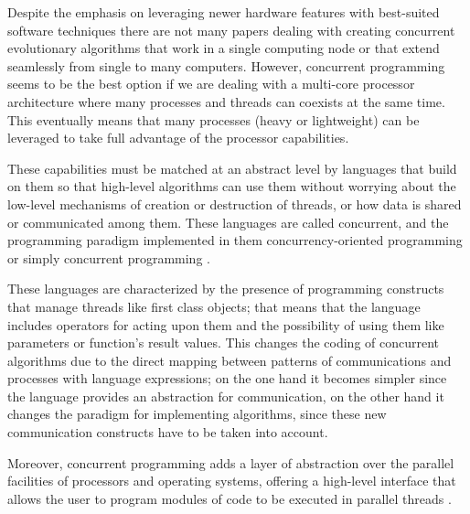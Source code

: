 \documentclass[runningheads]{llncs}\usepackage[]{graphicx}\usepackage[]{color}
\begin{document}
Despite the emphasis on leveraging newer hardware features
with best-suited software techniques
 there are not many papers \cite{Xia2010} dealing with 
creating concurrent evolutionary algorithms that work in a single
computing node or that extend seamlessly from single to many
computers. However, concurrent programming seems to be the best 
option if we are dealing with a multi-core processor architecture 
where many processes and threads can coexists at the same time. 
 This eventually means that many
processes (heavy or lightweight) can be leveraged to take full
advantage of the processor capabilities.

These capabilities must be matched at an abstract level by languages
that build on them so that high-level algorithms can use them without
worrying about the low-level mechanisms of creation or destruction of
threads, or how data is shared or communicated among them. These
languages are called concurrent, and the programming paradigm
implemented in them concurrency-oriented programming or simply
concurrent programming \cite{Armstrong2003}. 

These languages are characterized by the presence of
programming constructs that manage threads like first class
objects; that means that the language includes  operators for acting upon them and the
possibility of using them like parameters or function's result
values. This changes the coding of concurrent algorithms due to the
direct mapping between patterns of communications and processes with
language expressions; on the one hand it becomes simpler since the
language provides an abstraction for communication, on the other hand
it changes the paradigm for implementing algorithms, since these new
communication constructs have to be taken into account. 

Moreover, concurrent programming adds a layer of abstraction over the parallel
facilities of processors and operating systems, offering a
high-level interface that allows the user to program modules of code to
be executed in parallel threads \cite{andrews1991concurrent}.
\end{document}
